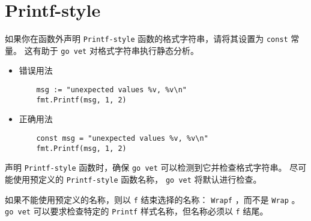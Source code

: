 \chapter{Printf-style}
如果你在函数外声明 \texttt{Printf-style} 函数的格式字符串，请将其设置为 \texttt{const} 常量。
这有助于 \texttt{go vet} 对格式字符串执行静态分析。
\begin{itemize}[leftmargin=4em]
\item 错误用法

  \begin{verbatim}
    msg := "unexpected values %v, %v\n"
    fmt.Printf(msg, 1, 2)
  \end{verbatim}
\item 正确用法

  \begin{verbatim}
    const msg = "unexpected values %v, %v\n"
    fmt.Printf(msg, 1, 2)
  \end{verbatim}
\end{itemize}

声明 \texttt{Printf-style} 函数时，确保 \texttt{go vet} 可以检测到它并检查格式字符串。
尽可能使用预定义的 \texttt{Printf-style} 函数名称， \texttt{go vet} 将默认进行检查。

如果不能使用预定义的名称，则以 \texttt{f} 结束选择的名称： \texttt{Wrapf} ，而不是 \texttt{Wrap} 。
\texttt{go vet} 可以要求检查特定的 \texttt{Printf} 样式名称，但名称必须以 \texttt{f} 结尾。
